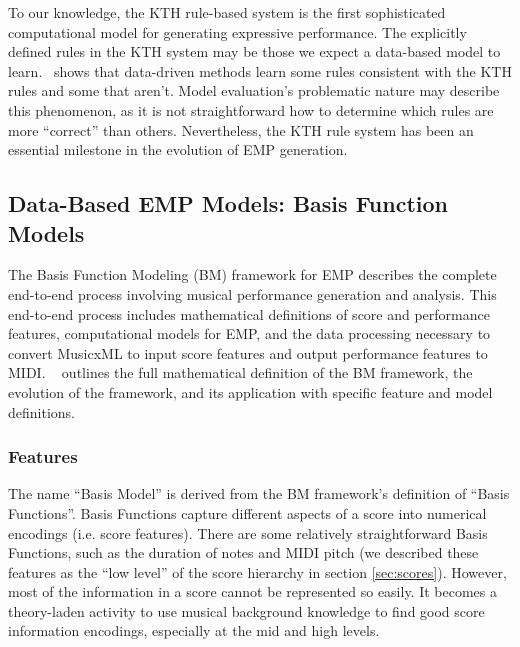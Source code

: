 To our knowledge, the KTH rule-based system is the first sophisticated computational model for generating expressive performance. The explicitly defined rules in the KTH system may be those we expect a data-based model to learn.~\citet{widmer2002machine} shows that data-driven methods learn some rules consistent with the KTH rules and some that aren't. Model evaluation's problematic nature may describe this phenomenon, as it is not straightforward how to determine which rules are more ``correct'' than others. Nevertheless, the KTH rule system has been an essential milestone in the evolution of EMP generation. 

\subsection{Data-Based EMP Models: Basis Function Models}\label{sec:data-based}
The Basis Function Modeling (BM) framework for EMP describes the complete end-to-end process involving musical performance generation and analysis. This end-to-end process includes mathematical definitions of score and performance features, computational models for EMP, and the data processing necessary to convert MusicxML to input score features and output performance features to MIDI.%
~\citet{eduardo2018computational} outlines the full mathematical definition of the BM framework, the evolution of the framework, and its application with specific feature and model definitions.

\subsubsection{Features}
The name ``Basis Model'' is derived from the BM framework's definition of ``Basis Functions''. Basis Functions capture different aspects of a score into numerical encodings (i.e. score features). There are some relatively straightforward Basis Functions, such as the duration of notes and MIDI pitch (we described these features as the ``low level'' of the score hierarchy in section \ref{sec:scores}). However, most of the information in a score cannot be represented so easily. It becomes a theory-laden activity to use musical background knowledge to find good score information encodings, especially at the mid and high levels.

\newcommand{\mperf}{\Beta_{\Omega}}

